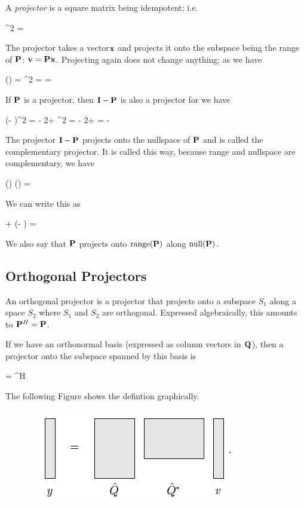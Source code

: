 
A \emph{projector} is a square matrix being idempotent; i.e.

\bee
\Pbf^2 = \Pbf
\eee

The projector takes a vector$\mathbf{x}$ and projects it onto the subspace being the range of $\mathbf{P}$: $\mathbf{v} = \mathbf{P} \mathbf{x}$. Projecting again does not change anything; as we have

\bee
\Pbf (\Pbf \xbf) = \Pbf^2 \xbf = \Pbf \xbf = \vbf
\eee

If $\mathbf{P}$ is a projector, then $\mathbf{I} - \mathbf{P}$ is also a projector for we have

\bee
(\Ibf - \Pbf)^2 = \Ibf - 2\Ibf\Pbf + \Pbf^2 = \Ibf - 2\Pbf + \Pbf = \Ibf - \Pbf
\eee

The projector $\mathbf{I} - \mathbf{P}$ projects onto the nullspace of $\mathbf{P}$ and is called the complementary projector. It is called this way, because range and nullspace are complementary, we have

\bee
{}(\Pbf) \cap {}(\Pbf) = \zerobf
\eee

We can write this as

\bee
\Pbf \xbf + (\Ibf - \Pbf) \xbf = \xbf
\eee


We also say that $\mathbf{P}$ projects onto $\text{range}(\mathbf{P})$ along $\text{null}(\mathbf{P})$.




\subsection{Orthogonal Projectors}

An orthogonal projector is a projector that projects onto a subspace $S_1$ along a space $S_2$ where $S_1$ and $S_2$ are orthogonal. Expressed algebraically, this amounts to $\mathbf{P}^H = \mathbf{P}$.

If we have an orthonormal basis (expressed as column vectors in $\mathbf{Q}$), then a projector onto the subspace spanned by this basis is

\bee
\Pbf = \Qbf \Qbf^H
\eee

The following Figure shows the defintion graphically.

\begin{figure}[hbt!]
\centering
\includegraphics[scale=0.5]{images/num_lin_algebra_04_1.png}
\end{figure}

